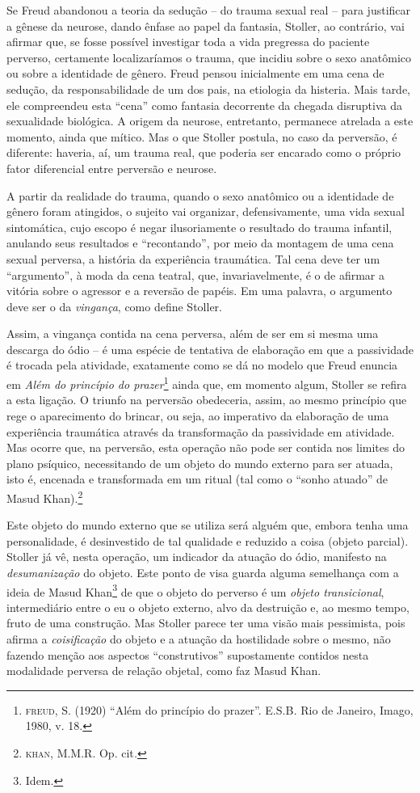 Se Freud abandonou a teoria da sedução -- do trauma sexual real -- para
justificar a gênese da neurose, dando ênfase ao papel da fantasia,
Stoller, ao contrário, vai afirmar que, se fosse possível investigar
toda a vida pregressa do paciente perverso, certamente localizaríamos o
trauma, que incidiu sobre o sexo anatômico ou sobre a identidade de
gênero. Freud pensou inicialmente em uma cena de sedução, da
responsabilidade de um dos pais, na etiologia da histeria. Mais tarde,
ele compreendeu esta ``cena'' como fantasia decorrente da chegada
disruptiva da sexualidade biológica. A origem da neurose, entretanto,
permanece atrelada a este momento, ainda que mítico. Mas o que Stoller
postula, no caso da perversão, é diferente: haveria, aí, um trauma real,
que poderia ser encarado como o próprio fator diferencial entre
perversão e neurose.

A partir da realidade do trauma, quando o sexo anatômico ou a identidade
de gênero foram atingidos, o sujeito vai organizar, defensivamente, uma
vida sexual sintomática, cujo escopo é negar ilusoriamente o resultado
do trauma infantil, anulando seus resultados e ``recontando'', por meio
da montagem de uma cena sexual perversa, a história da experiência
traumática. Tal cena deve ter um ``argumento'', à moda da cena teatral,
que, invariavelmente, é o de afirmar a vitória sobre o agressor e a
reversão de papéis. Em uma palavra, o argumento deve ser o da
\emph{vingança}, como define Stoller.

Assim, a vingança contida na cena perversa, além de ser em si mesma uma
descarga do ódio -- é uma espécie de tentativa de elaboração em que a
passividade é trocada pela atividade, exatamente como se dá no modelo
que Freud enuncia em \emph{Além do princípio do prazer}\footnote{\textsc{freud},
  S. (1920) ``Além do princípio do prazer''. E.S.B\emph{.} Rio de
  Janeiro, Imago, 1980, v. 18.} ainda que, em momento algum, Stoller se
refira a esta ligação. O triunfo na perversão obedeceria, assim, ao
mesmo princípio que rege o aparecimento do brincar, ou seja, ao
imperativo da elaboração de uma experiência traumática através da
transformação da passividade em atividade. Mas ocorre que, na perversão,
esta operação não pode ser contida nos limites do plano psíquico,
necessitando de um objeto do mundo externo para ser atuada, isto é,
encenada e transformada em um ritual (tal como o ``sonho atuado'' de
Masud Khan).\footnote{\textsc{khan}, M.M.R. Op. cit\emph{.}}

Este objeto do mundo externo que se utiliza será alguém que, embora
tenha uma personalidade, é desinvestido de tal qualidade e reduzido a
coisa (objeto parcial). Stoller já vê, nesta operação, um indicador da
atuação do ódio, manifesto na \emph{desumanização} do objeto. Este ponto
de visa guarda alguma semelhança com a ideia de Masud Khan\footnote{Idem.}
de que o objeto do perverso é um \emph{objeto transicional},
intermediário entre o eu o objeto externo, alvo da destruição e, ao
mesmo tempo, fruto de uma construção. Mas Stoller parece ter uma visão
mais pessimista, pois afirma a \emph{coisificação} do objeto e a atuação
da hostilidade sobre o mesmo, não fazendo menção aos aspectos
``construtivos'' supostamente contidos nesta modalidade perversa de
relação objetal, como faz Masud Khan.

